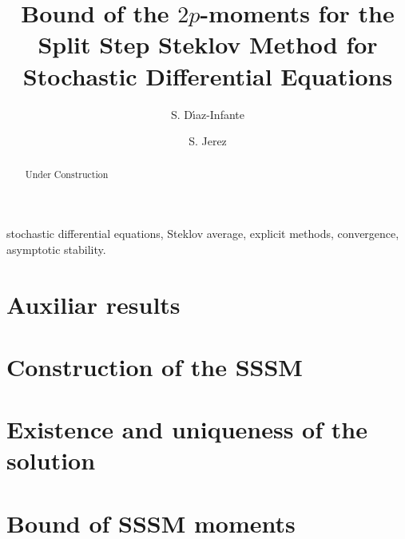 \documentclass[review]{elsarticle}
\begin{document}
	\begin{frontmatter}
	    \title{
	    	Bound of the $2p$-moments for the Split Step Steklov Method
	    	for Stochastic Differential Equations
	    }%
	    \author[sj]{S. D\'{\i}az-Infante}
	    \author[sj]{S. Jerez}
	    \address[sj]{
	    Department of Applied Mathematics, CIMAT, Guanajuato, Gto., Mexico,
	    36240.
	    }
	    \begin{abstract}
	      Under Construction
	    \end{abstract}
	    \begin{keyword}
	      stochastic differential equations, Steklov average,
	      explicit methods, convergence, asymptotic stability.
	    \end{keyword}
	\end{frontmatter}
	\section{Auxiliar results}
		
	\section{Construction of the SSSM}
		
	\section{Existence and uniqueness of the solution}
		
		
	\section{Bound of SSSM moments}
		
		
	\section*{\refname}
	
	
\end{document}
